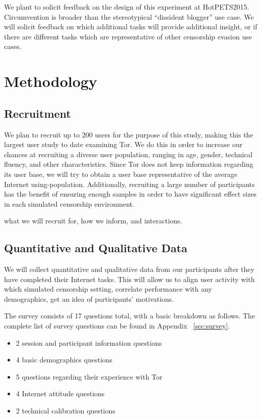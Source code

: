 \documentclass[letterpaper,twocolumn,11pt]{article}
\begin{document}
We plant to solicit feedback on the design of this experiment at HotPETS2015. 
Circumvention is broader than the stereotypical ``dissident blogger'' 
use case. We will solicit feedback on which additional tasks will provide additional insight,
or if there are different tasks which are representative of other censorship evasion use cases.

\section{Methodology}  

\subsection{Recruitment}  
\indent \indent We plan to recruit up to 200 users for the purpose of this study, making this the largest user 
study to date examining Tor. We do this in order to increase our chances at recruiting a diverse
user population, ranging in age, gender, technical fluency, and other characteristics. Since Tor 
does not keep information regarding its user base, we will try to obtain a user base representative of
the average Internet using-population. Additionally, recruiting a large number of participants has the 
benefit of ensuring enough samples in order to have significant effect sizes in 
each simulated censorship environment. 

{\color {red} what we will recruit for, how we inform, and interactions.} 

\subsection{Quantitative and Qualitative Data}   
\indent \indent We will collect quantitative and qualitative data from our participants after they have completed 
their Internet tasks. This will allow us to align user activity with which simulated censorship setting, 
correlate performance with any demographics, get an idea of participants' motivations. 

The survey consists of 17 questions total, with a basic breakdown as follows. 
The complete list of survey questions can be found in Appendix ~\ref{sec:survey}.

\begin{itemize} \itemsep1pt \parskip0pt 
\item 2 session and participant information questions
\item 4 basic demographics questions
\item 5 questions regarding their experience with Tor
\item 4 Internet attitude questions
\item 2 technical calibration questions
\end{itemize}
\end{document}
